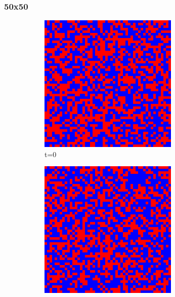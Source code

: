 \documentclass[a4paper, 11pt]{article}
\begin{document}
\subsubsection{50x50}
\begin{figure}[H]
\centering
\begin{subfigure}{.25\textwidth}
  \centering
  \includegraphics[width=0.9\linewidth]{SNOWDRIFT_VON_NEUMANN_50x50_t00}
  \caption{t=0}
\end{subfigure}%
\begin{subfigure}{.25\textwidth}
  \centering
  \includegraphics[width=0.9\linewidth]{SNOWDRIFT_VON_NEUMANN_50x50_t01}

\end{subfigure}
\end{figure}
\end{document}
